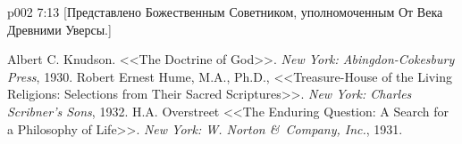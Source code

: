 \vsetoff
\vs p002 7:13 [Представлено Божественным Советником, уполномоченным От Века Древними Уверсы.]
\quizlink
\begin{thebibliography}{100}
Albert C. Knudson.
{<<The Doctrine of God>>.}
{\em New York: Abingdon-Cokesbury Press}, 1930.
Robert Ernest Hume, M.A., Ph.D.,
{<<Treasure\hyp{}House of the Living Religions: Selections from Their Sacred Scriptures>>.}
{\em New York: Charles Scribner's Sons}, 1932.
H.A. Overstreet
{<<The Enduring Question: A Search for a Philosophy of Life>>.}
{\em New York: W. Norton \&\ Company, Inc.}, 1931.
\end{thebibliography}
